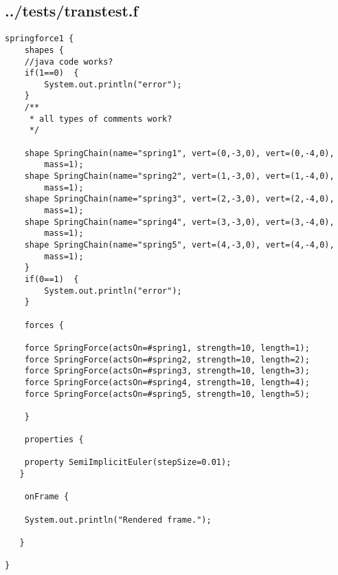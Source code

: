 \subsection*{../tests/transtest.f}
\begin{lstlisting}
springforce1 {
    shapes {
	//java code works?
	if(1==0)  {
		System.out.println("error");
	}
	/**
	 * all types of comments work?
	 */

	shape SpringChain(name="spring1", vert=(0,-3,0), vert=(0,-4,0),
		mass=1);
	shape SpringChain(name="spring2", vert=(1,-3,0), vert=(1,-4,0),
		mass=1);
	shape SpringChain(name="spring3", vert=(2,-3,0), vert=(2,-4,0),
		mass=1);
	shape SpringChain(name="spring4", vert=(3,-3,0), vert=(3,-4,0),
		mass=1);
	shape SpringChain(name="spring5", vert=(4,-3,0), vert=(4,-4,0),
		mass=1);
    }
	if(0==1)  {
		System.out.println("error");
	}

    forces {

	force SpringForce(actsOn=#spring1, strength=10, length=1);
	force SpringForce(actsOn=#spring2, strength=10, length=2);
	force SpringForce(actsOn=#spring3, strength=10, length=3);
	force SpringForce(actsOn=#spring4, strength=10, length=4);
	force SpringForce(actsOn=#spring5, strength=10, length=5);

    }

    properties { 

	property SemiImplicitEuler(stepSize=0.01);
   }

    onFrame {

	System.out.println("Rendered frame.");

   }   

}
\end{lstlisting}

